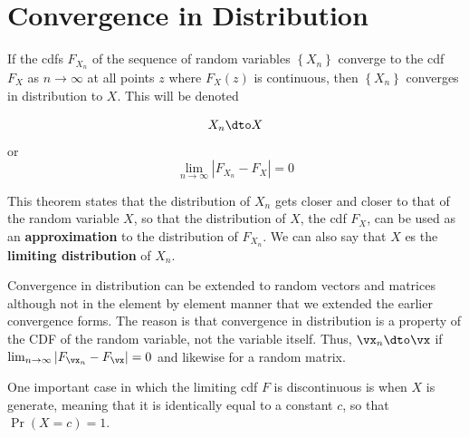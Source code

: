 


\section{Convergence in Distribution}


\begin{definition}\label{definition:convergece_in_distribution}
	If the cdfs $F_{X_n}$ of the sequence of random variables $\left\lbrace X_n \right\rbrace $ converge to the cdf $F_{X}$ as $n\to \infty$ at all points $z$ where $F_{X}(z)$ is continuous, then $\left\lbrace X_n\right\rbrace $ converges in distribution to $X$. This will be denoted
	
	\begin{equation*}
	X_n\dto X
	\end{equation*}
%	
or 
	\begin{equation*}
	\lim_{n\to \infty}|F_{X_n}-F_{X}| = 0
	\end{equation*}
\end{definition}

This theorem states that the distribution of $X_n$ gets closer and closer to that of the random variable $X$, so that the distribution of $X$, the cdf $F_{X}$, can be used as an \textbf{approximation} to the distribution of $F_{X_n}$.  We can also say that $X$ es the \textbf{limiting distribution} of $X_n$.


Convergence in distribution can be extended to random vectors and matrices although not in the element by element manner that we extended the earlier convergence forms. The reason is that convergence in distribution is a property of the CDF of the random variable, not the variable itself. Thus, $\vx_n\dto \vx$ if $\lim_{n\to \infty}|F_{\vx_n}-F_{\vx}| = 0$ and likewise for a random matrix. 


\begin{remark}
  One important case in which the limiting cdf $F$ is discontinuous is when $X$ is generate, meaning that it is identically equal to a constant $c$, so that $\Pr(X = c) = 1$. 
\end{remark}

